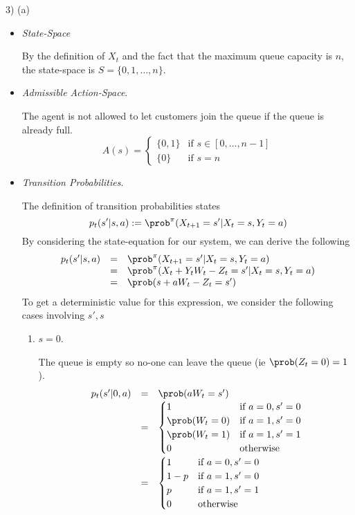 \documentclass[11pt,a4paper]{article}
\begin{document}
\begin{answer}{3) (a)}
\begin{itemize}
    \item \textit{State-Space}
    \par By the definition of $X_t$ and the fact that the maximum queue capacity is $n$, the state-space is $S=\{0,1,\dots,n\}$.

    \item \textit{Admissible Action-Space}.
    \par The agent is not allowed to let customers join the queue if the queue is already full.
    \[ A(s)=\begin{cases}\{0,1\}&\text{if }s\in[0,\dots,n-1]\\\{0\}&\text{if }s=n\end{cases} \]

    \item \textit{Transition Probabilities}.
    \par The definition of transition probabilities states
    \[ p_t(s'|s,a):=\prob^\pi(X_{t+1}=s'|X_t=s,Y_t=a) \]
    By considering the state-equation for our system, we can derive the following
    \[\begin{array}{rcl}
      p_t(s'|s,a)&=&\prob^\pi(X_{t+1}=s'|X_t=s,Y_t=a)\\
      &=&\prob^\pi(X_t+Y_tW_t-Z_t=s'|X_t=s,Y_t=a)\\
      &=&\prob(s+aW_t-Z_t=s')\\
    \end{array}\]
    To get a deterministic value for this expression, we consider the following cases involving $s',s$
    \begin{enumerate}

      \item $s=0$.
      \par The queue is empty so no-one can leave the queue (ie $\prob(Z_t=0)=1$).
      \[\begin{array}{rcl}
        p_t(s'|0,a)&=&\prob(aW_t=s')\\
                   &=& \begin{cases}
                         1&\text{if }a=0,s'=0\\
                         \prob(W_t=0)&\text{if }a=1,s'=0\\
                         \prob(W_t=1)&\text{if }a=1,s'=1\\
                         0&\text{otherwise}
                       \end{cases}\\
                   &=& \begin{cases}
                         1&\text{if }a=0,s'=0\\
                         1-p&\text{if }a=1,s'=0\\
                         p&\text{if }a=1,s'=1\\
                         0&\text{otherwise}
                       \end{cases}\\
      \end{array}\]


\end{enumerate}
\end{itemize}
\end{answer}
\end{document}
